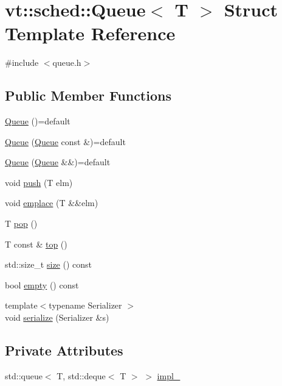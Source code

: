 \hypertarget{structvt_1_1sched_1_1_queue}{}\section{vt\+:\+:sched\+:\+:Queue$<$ T $>$ Struct Template Reference}
\label{structvt_1_1sched_1_1_queue}


{\ttfamily \#include $<$queue.\+h$>$}

\subsection*{Public Member Functions}
\begin{DoxyCompactItemize}
\item 
\hyperlink{structvt_1_1sched_1_1_queue_a5bca57d5a8c3bb7bfb30ed1bc634c29f}{Queue} ()=default
\item 
\hyperlink{structvt_1_1sched_1_1_queue_a718cecfdd0b3fa8ec80fe4768e153467}{Queue} (\hyperlink{structvt_1_1sched_1_1_queue}{Queue} const \&)=default
\item 
\hyperlink{structvt_1_1sched_1_1_queue_a0a85a456ebc179a2f7ab77369566eb5c}{Queue} (\hyperlink{structvt_1_1sched_1_1_queue}{Queue} \&\&)=default
\item 
void \hyperlink{structvt_1_1sched_1_1_queue_a5079f0b8b665ec528767a12ab210d1be}{push} (T elm)
\item 
void \hyperlink{structvt_1_1sched_1_1_queue_a5b99b53786540fdff718540010fecb1b}{emplace} (T \&\&elm)
\item 
T \hyperlink{structvt_1_1sched_1_1_queue_ad5e435489eb04cd78a2da6acfa855331}{pop} ()
\item 
T const  \& \hyperlink{structvt_1_1sched_1_1_queue_a636c676d2dc99d283ba3607e7ed5b390}{top} ()
\item 
std\+::size\+\_\+t \hyperlink{structvt_1_1sched_1_1_queue_a0d5cd0a31703541be21f3bbd1590464e}{size} () const
\item 
bool \hyperlink{structvt_1_1sched_1_1_queue_a499b45b0a8c55731b09885dbd28882a8}{empty} () const
\item 
{\footnotesize template$<$typename Serializer $>$ }\\void \hyperlink{structvt_1_1sched_1_1_queue_aaa65b12c2cd3aca57fc59a1d5db25792}{serialize} (Serializer \&s)
\end{DoxyCompactItemize}
\subsection*{Private Attributes}
\begin{DoxyCompactItemize}
\item 
std\+::queue$<$ T, std\+::deque$<$ T $>$ $>$ \hyperlink{structvt_1_1sched_1_1_queue_a68cbe05570c230c55b730d8e98a1f6a5}{impl\+\_\+}
\end{DoxyCompactItemize}


